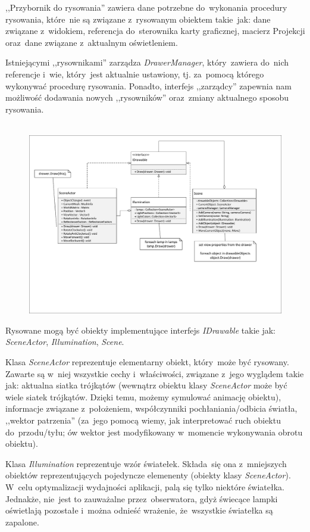 \documentclass[11pt, a4paper, oneside]{scrartcl}
\begin{document}
,,Przybornik do rysowania'' zawiera dane potrzebne do~wykonania procedury rysowania, które~nie są związane z~rysowanym obiektem takie~jak:
dane związane z~widokiem, referencja do~sterownika karty graficznej, macierz Projekcji oraz~dane związane z~aktualnym oświetleniem.

Istniejącymi ,,rysownikami'' zarządza \textit{DrawerManager}, który~zawiera do~nich referencje
i~wie, który~jest aktualnie ustawiony, tj. za~pomocą którego wykonywać procedurę rysowania. Ponadto, interfejs ,,zarządcy'' zapewnia nam możliwość
dodawania nowych ,,rysowników'' oraz~zmiany aktualnego sposobu rysowania. \\ \\
\begin{figure}[H]
	\centering 
	\includegraphics[scale=0.6]{IDrawable.pdf}
\end{figure}
Rysowane mogą być obiekty implementujące interfejs \textit{IDrawable} takie jak: \textit{SceneActor}, \textit{Illumination}, \textit{Scene}.

Klasa \textit{SceneActor} reprezentuje elementarny obiekt, który~może być rysowany. Zawarte są w~niej wszystkie cechy i~właściwości,
związane z~jego wyglądem takie jak: aktualna siatka trójkątów (wewnątrz obiektu klasy \textit{SceneActor} może być wiele siatek trójkątów. Dzięki temu,
możemy symulować animację obiektu), informacje związane z~położeniem, współczynniki pochłaniania/odbicia światła, ,,wektor patrzenia'' (za~jego pomocą
wiemy, jak interpretować ruch obiektu do~przodu/tyłu; ów wektor jest modyfikowany w~momencie wykonywania obrotu obiektu).

Klasa \textit{Illumination} reprezentuje wzór światełek. Składa~się ona z~mniejszych obiektów reprezentujących pojedyncze elemenenty (obiekty klasy \textit{SceneActor}). W~celu optymalizacji wydajności aplikacji, palą się tylko niektóre światełka. Jednakże, nie~jest to zauważalne przez~obserwatora,
gdyż świecące lampki oświetlają pozostałe i~można odnieść wrażenie, że~wszystkie światełka są zapalone. 
\end{document}
